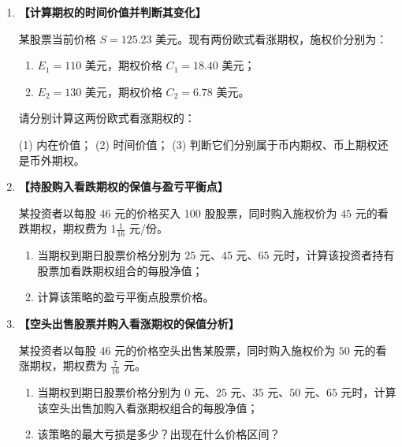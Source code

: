 \documentclass[10pt]{article}
\begin{document}
\begin{enumerate}[label=\textbf{\arabic*.}]
\vspace{0cm}

\item  {\bf{【计算期权的时间价值并判断其变化】}} %

某股票当前价格 \(S = 125.23\) 美元。现有两份欧式看涨期权，施权价分别为：

\begin{enumerate}[label=(\arabic*)]
    \item \(E_1 = 110\) 美元，期权价格 \(C_1 = 18.40\) 美元；
    \item \(E_2 = 130\) 美元，期权价格 \(C_2 = 6.78\) 美元。
\end{enumerate}

请分别计算这两份欧式看涨期权的：

(1) 内在价值；\hspace{1cm}
(2) 时间价值；\hspace{1cm}
(3) 判断它们分别属于币内期权、币上期权还是币外期权。

\vspace{0cm}


\item  {\bf{【持股购入看跌期权的保值与盈亏平衡点】}} %

某投资者以每股 \(46\) 元的价格买入 100 股股票，同时购入施权价为 \(45\) 元的看跌期权，期权费为 \(1\frac{1}{16}\) 元/份。

\begin{enumerate}[label=(\arabic*)]
    \item 当期权到期日股票价格分别为 \(25\) 元、\(45\) 元、\(65\) 元时，计算该投资者持有股票加看跌期权组合的每股净值；
    \item 计算该策略的盈亏平衡点股票价格。
\end{enumerate}

\vspace{0cm}

\item  {\bf{【空头出售股票并购入看涨期权的保值分析】}} %

某投资者以每股 \(46\) 元的价格空头出售某股票，同时购入施权价为 \(50\) 元的看涨期权，期权费为 \(\frac{7}{16}\) 元。

\begin{enumerate}[label=(\arabic*)]
    \item 当期权到期日股票价格分别为 \(0\) 元、\(25\) 元、\(35\) 元、\(50\) 元、\(65\) 元时，计算该空头出售加购入看涨期权组合的每股净值；
    \item 该策略的最大亏损是多少？出现在什么价格区间？
\end{enumerate}


\end{enumerate}
\end{document}
